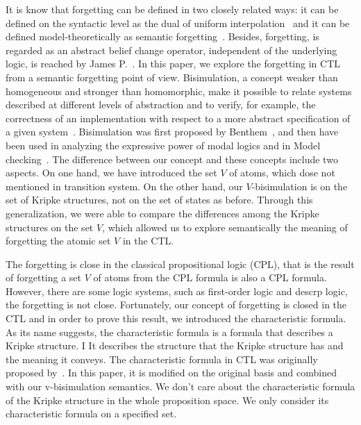 \documentclass{article}
\begin{document}
It is know that forgetting can be defined in two closely related ways: it can be defined on
the syntactic level as the dual of uniform interpolation~\cite{konev2009forgetting} and it can be defined model-theoretically as semantic forgetting~\cite{zhao2017role}.
Besides, forgetting, is regarded as an abstract belief change operator, independent of
the underlying logic, is reached by James P.~\cite{DBLP:journals/jair/Delgrande17}.
In this paper, we explore the forgetting in CTL from a semantic forgetting point of view. Bisimulation, a concept weaker than homogeneous and stronger than homomorphic, make it possible to relate systems described at different levels of abstraction and to verify, for example, the correctness of an implementation with respect to a more abstract specification of a given system~\cite{DBLP:reference/mc/ClarkeHV18}. Bisimulation was first proposed by Benthem~\cite{Benthem1977Modal}, and
then have been used in analyzing the expressive power of modal logics and in Model checking~\cite{Baier:PMC:2008}. The difference between our concept and these concepts include two aspects. On one hand, we have introduced the set $V$ of atoms, which dose not mentioned in transition system. On the other hand, our $V$-bisimulation is on the set of Kripke structures, not on the set of states as before. Through this generalization, we were able to compare the differences among the Kripke structures on the set $V$, which allowed us to explore semantically the meaning of forgetting the atomic set $V$ in the CTL.



The forgetting is close in the classical propositional logic (CPL), that is the result of forgetting a set $V$ of atoms from the CPL formula is also a CPL formula. However, there are some logic systems, such as first-order logic and descrp logic, the forgetting is not close. Fortunately, our concept of forgetting is closed in the CTL and in order to prove this result, we introduced the characteristic formula. As its name suggests, the characteristic formula is a formula that describes a Kripke structure. I It describes the structure that the Kripke structure has and the meaning it conveys. The characteristic formula in CTL was originally proposed by~\cite{DBLP:journals/tcs/BrowneCG88}. In this paper, it is modified on the original basis and combined with our v-bisimulation semantics. We don't care about the characteristic formula of the Kripke structure in the whole proposition space. We only consider its characteristic formula on a specified set.
\end{document}
